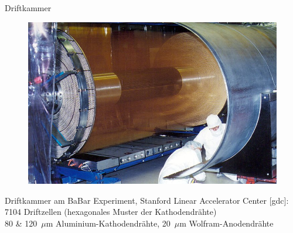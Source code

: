 \begin{frame}{Driftkammer}
    	\begin{figure}[htbp]
				  \centering
				  \includegraphics[scale=0.9]{bilder/beispiele/driftchamber.jpg}
		\end{figure}
		Driftkammer am BaBar Experiment, Stanford Linear Accelerator Center [gdc]:\\
		7104 Driftzellen (hexagonales Muster der Kathodendrähte)\\
		80 \& 120~$\mu$m Aluminium-Kathodendrähte, 20~$\mu$m Wolfram-Anodendrähte

\end{frame}
